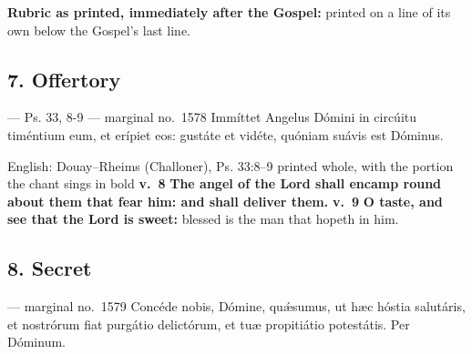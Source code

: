\textbf{Rubric as printed, immediately after the Gospel:} 
\textperiodcentered{} printed on a line of its own below the Gospel's last line.


\elementguard
\subsection*{7. Offertory }

\begin{appointedlatin}{ --- Ps. 33, 8-9 --- marginal no.\ 1578}
Immíttet Angelus Dómini in circúitu timéntium eum, et erípiet eos: gustáte et
vidéte, quóniam suávis est Dóminus.
\end{appointedlatin}

\begin{namedtranslation}{English: Douay--Rheims (Challoner), Ps. 33:8--9 printed whole, with the portion the chant sings in bold}
\textbf{v.~8} \textbf{The angel of the Lord shall encamp round about them that
fear him: and shall deliver them.} \textbf{v.~9} \textbf{O taste, and see that
the Lord is sweet:} blessed is the man that hopeth in him.
\end{namedtranslation}


\elementguard
\subsection*{8. Secret }

\begin{appointedlatin}{ --- marginal no.\ 1579}
Concéde nobis, Dómine, quǽsumus, ut hæc hóstia salutáris, et nostrórum fiat
purgátio delictórum, et tuæ propitiátio potestátis. Per Dóminum.
\end{appointedlatin}

